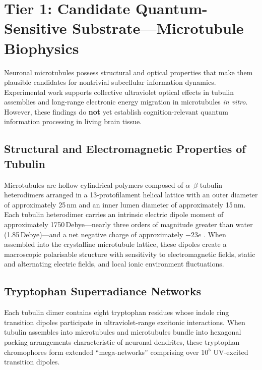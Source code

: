 \documentclass[10pt, a4paper, twocolumn]{article}
\begin{document}
\section{Tier 1: Candidate Quantum-Sensitive Substrate---Microtubule
Biophysics}

Neuronal microtubules possess structural and optical properties that
make them plausible candidates for nontrivial subcellular information
dynamics. Experimental work supports collective ultraviolet optical
effects in tubulin assemblies and long-range electronic energy migration
in microtubules \emph{in vitro}. However, these findings do
\textbf{not} yet establish cognition-relevant quantum information
processing in living brain tissue.

\subsection{Structural and Electromagnetic Properties of Tubulin}

Microtubules are hollow cylindrical polymers composed of
$\alpha$--$\beta$ tubulin heterodimers arranged in a 13-protofilament
helical lattice with an outer diameter of approximately 25\,nm and an
inner lumen diameter of approximately 15\,nm. Each tubulin heterodimer
carries an intrinsic electric dipole moment of approximately
1750\,Debye---nearly three orders of magnitude greater than water
(1.85\,Debye)---and a net negative charge of approximately $-23e$
\cite{craddock2017}. When assembled into the crystalline microtubule
lattice, these dipoles create a macroscopic polarisable structure with
sensitivity to electromagnetic fields, static and alternating electric
fields, and local ionic environment fluctuations.

\subsection{Tryptophan Superradiance Networks}

Each tubulin dimer contains eight tryptophan residues whose indole ring
transition dipoles participate in ultraviolet-range excitonic
interactions. When tubulin assembles into microtubules and microtubules
bundle into hexagonal packing arrangements characteristic of neuronal
dendrites, these tryptophan chromophores form extended ``mega-networks''
comprising over $10^5$ UV-excited transition dipoles.
\end{document}
